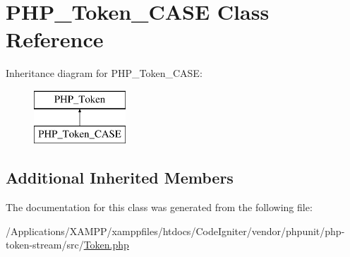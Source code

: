 \hypertarget{class_p_h_p___token___c_a_s_e}{}\section{P\+H\+P\+\_\+\+Token\+\_\+\+C\+A\+SE Class Reference}
\label{class_p_h_p___token___c_a_s_e}
Inheritance diagram for P\+H\+P\+\_\+\+Token\+\_\+\+C\+A\+SE\+:\begin{figure}[H]
\begin{center}
\leavevmode
\includegraphics[height=2.000000cm]{class_p_h_p___token___c_a_s_e}
\end{center}
\end{figure}
\subsection*{Additional Inherited Members}


The documentation for this class was generated from the following file\+:\begin{DoxyCompactItemize}
\item 
/\+Applications/\+X\+A\+M\+P\+P/xamppfiles/htdocs/\+Code\+Igniter/vendor/phpunit/php-\/token-\/stream/src/\mbox{\hyperlink{_token_8php}{Token.\+php}}\end{DoxyCompactItemize}
